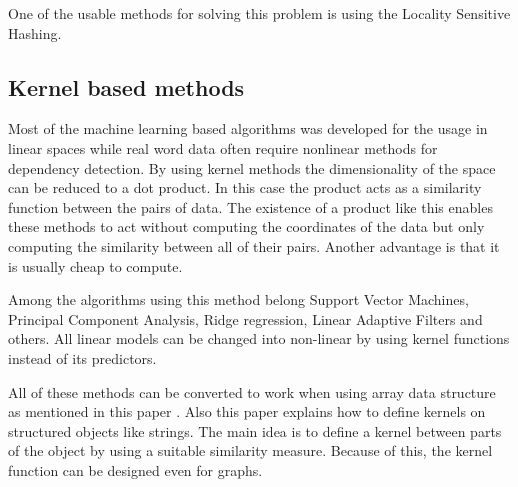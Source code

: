One of the usable methods for solving this problem is using the Locality Sensitive Hashing.

\subsection{Kernel based methods}
Most of the machine learning based algorithms was developed for the usage in linear spaces while real word data often require nonlinear methods for dependency detection. By using kernel methods the dimensionality of the space can be reduced to a dot product. In this case the product acts as a similarity function between the pairs of data. The existence of a product like this enables these methods to act without computing the coordinates of the data but only computing the similarity between all of their pairs. Another advantage is that it is usually cheap to compute.

Among the algorithms using this method belong Support Vector Machines, Principal Component Analysis, Ridge regression, Linear Adaptive Filters and others. All linear models can be changed into non-linear by using kernel functions instead of its predictors. \cite{kernel} \cite{machineLearning}

All of these methods can be converted to work when using array data structure as mentioned in this paper \cite{kernelArray}. Also this paper \cite{kernelstring} explains how to define kernels on structured objects like strings. The main idea is to define a kernel between parts of the object by using a suitable similarity measure. Because of this, the kernel function can be designed even for graphs.

